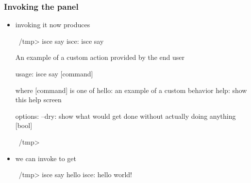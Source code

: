 \begin{frame}[fragile]
%
  \frametitle{Invoking the  panel}
%
  \begin{itemize}
%
  \item invoking it now produces
%
    \begin{ish}[gobble=4]{}
      ~/tmp> isce say
      isce: isce say

          An example of a custom action provided by the end user

      usage:
          isce say [command]

      where [command] is one of
         hello: an example of a custom behavior
          help: show this help screen

      options:
          --dry: show what would get done without actually doing anything [bool]

      ~/tmp>
    \end{ish}
%
  \item we can invoke  to get
%
    \begin{ish}[firstnumber=16, gobble=4]{}
      ~/tmp> isce say hello
      isce: hello world!
    \end{ish}
%
  \end{itemize}
%
\end{frame}


